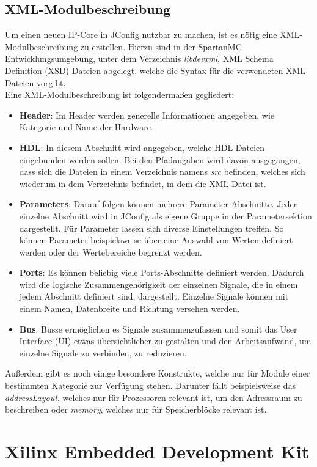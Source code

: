 \subsection{XML-Modulbeschreibung} \label{subsec:xml}
Um einen neuen IP-Core in JConfig nutzbar zu machen, ist es nötig eine XML-Modulbeschreibung zu erstellen. Hierzu sind in der SpartanMC Entwicklungsumgebung, unter dem Verzeichnis \textit{libdevxml}, XML Schema Definition (XSD) Dateien abgelegt, welche die Syntax für die verwendeten XML-Dateien
vorgibt.\\
Eine XML-Modulbeschreibung ist folgendermaßen gegliedert:
\begin{itemize}
\item \textbf{Header}: Im Header werden generelle Informationen angegeben, wie Kategorie und Name der Hardware.
\item \textbf{HDL}: In diesem Abschnitt wird angegeben, welche HDL-Dateien eingebunden werden sollen. Bei den Pfadangaben wird davon ausgegangen, dass sich die Dateien in einem Verzeichnis namens \textit{src} befinden, welches sich wiederum in dem Verzeichnis befindet, in dem die XML-Datei ist.
\item \textbf{Parameters}: Darauf folgen können mehrere Parameter-Abschnitte. Jeder einzelne Abschnitt wird in JConfig als eigene Gruppe in der Parametersektion dargestellt. Für Parameter lassen sich diverse Einstellungen treffen. So können Parameter beispielsweise über eine Auswahl von Werten definiert werden oder der Wertebereiche begrenzt werden.
\item \textbf{Ports}: Es können beliebig viele Ports-Abschnitte definiert werden. Dadurch wird die logische Zusammengehörigkeit der einzelnen Signale, die in einem jedem Abschnitt definiert sind, dargestellt. Einzelne Signale können mit einem Namen, Datenbreite und Richtung versehen werden.
\item \textbf{Bus}: Busse ermöglichen es Signale zusammenzufassen und somit das User Interface (UI) etwas übersichtlicher zu gestalten und den Arbeitsaufwand, um einzelne Signale zu verbinden, zu reduzieren.
\end{itemize} 
Außerdem gibt es noch einige besondere Konstrukte, welche nur für Module einer bestimmten Kategorie zur Verfügung stehen. Darunter fällt beispielsweise das \textit{addressLayout}, welches nur für Prozessoren relevant ist, um den Adressraum zu beschreiben oder \textit{memory}, welches nur für Speicherblöcke relevant ist.

\section{Xilinx Embedded Development Kit}
